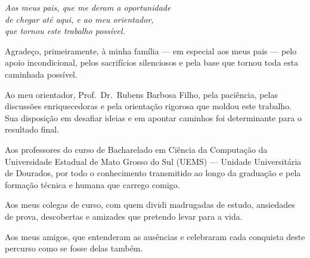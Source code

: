 \documentclass[
      12pt,
      a4paper,
      openright,
      oneside,
      chapter=TITLE,
      section=TITLE,
      english,
      french,
      spanish,
      brazilian
    ]{abntex2}
\begin{document}
    \begin{dedicatoria}
        \vspace*{\fill}
        \begin{flushright}
            \textit{Aos meus pais, que me deram a oportunidade\\
            de chegar até aqui, e ao meu orientador,\\
            que tornou este trabalho possível.}
        \end{flushright}
        \vspace*{1cm}
    \end{dedicatoria}
    
    \begin{agradecimentos}
    
    Agradeço, primeiramente, à minha família --- em especial aos meus pais --- pelo apoio incondicional, pelos sacrifícios silenciosos e pela base que tornou toda esta caminhada possível.
    
    Ao meu orientador, Prof.\ Dr.\ Rubens Barbosa Filho, pela paciência, pelas discussões enriquecedoras e pela orientação rigorosa que moldou este trabalho. Sua disposição em desafiar ideias e em apontar caminhos foi determinante para o resultado final.
    
    Aos professores do curso de Bacharelado em Ciência da Computação da Universidade Estadual de Mato Grosso do Sul (UEMS) --- Unidade Universitária de Dourados, por todo o conhecimento transmitido ao longo da graduação e pela formação técnica e humana que carrego comigo.
    
    Aos meus colegas de curso, com quem dividi madrugadas de estudo, ansiedades de prova, descobertas e amizades que pretendo levar para a vida.
    
    Aos meus amigos, que entenderam as ausências e celebraram cada conquista deste percurso como se fosse delas também.
    
    \end{agradecimentos}
    
\end{document}
